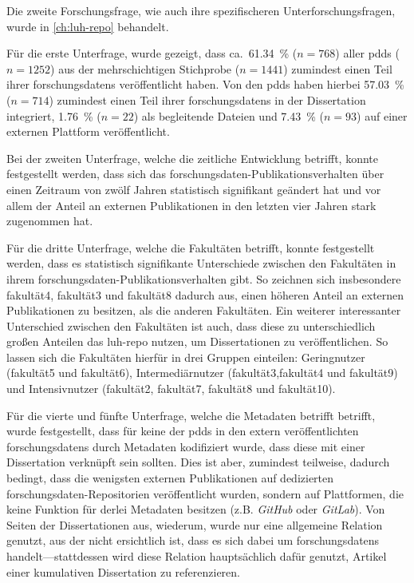 Die zweite Forschungsfrage, wie auch ihre spezifischeren Unterforschungsfragen, wurde in \cref{ch:luh-repo} behandelt.

Für die erste Unterfrage, wurde gezeigt, dass ca.~\SI{61,34}{\percent} ($n=\num{768}$) aller \glspl{pdd} ($n=\num{1252}$) aus der mehrschichtigen Stichprobe ($n=\num{1441}$) zumindest einen Teil ihrer \glspl{forschungsdaten} veröffentlicht haben.
Von den \glspl{pdd} haben hierbei \SI{57,03}{\percent} ($n=\num{714}$) zumindest einen Teil ihrer \glspl{forschungsdaten} in der Dissertation integriert, \SI{1,76}{\percent} ($n=\num{22}$) als begleitende Dateien und \SI{7,43}{\percent} ($n=\num{93}$) auf einer externen Plattform veröffentlicht.

Bei der zweiten Unterfrage, welche die zeitliche Entwicklung betrifft, konnte festgestellt werden, dass sich das \gls{forschungsdaten}-Publikationsverhalten über einen Zeitraum von zwölf Jahren statistisch signifikant geändert hat und vor allem der Anteil an externen Publikationen in den letzten vier Jahren stark zugenommen hat.

Für die dritte Unterfrage, welche die Fakultäten betrifft, konnte festgestellt werden, dass es statistisch signifikante Unterschiede zwischen den Fakultäten in ihrem \gls{forschungsdaten}-Publikationsverhalten gibt.
So zeichnen sich insbesondere \gls{fakultät4}, \gls{fakultät3} und \gls{fakultät8} dadurch aus, einen höheren Anteil an externen Publikationen zu besitzen, als die anderen Fakultäten.
Ein weiterer interessanter Unterschied zwischen den Fakultäten ist auch, dass diese zu unterschiedlich großen Anteilen das \gls{luh-repo} nutzen, um Dissertationen zu veröffentlichen.
So lassen sich die Fakultäten hierfür in drei Gruppen einteilen:
Geringnutzer (\gls{fakultät5} und \gls{fakultät6}), Intermediärnutzer (\gls{fakultät3},\gls{fakultät4} und \gls{fakultät9}) und Intensivnutzer (\gls{fakultät2}, \gls{fakultät7}, \gls{fakultät8} und \gls{fakultät10}).

Für die vierte und fünfte Unterfrage, welche die Metadaten betrifft betrifft, wurde festgestellt, dass für keine der \glspl{pdd} in den extern veröffentlichten \glspl{forschungsdaten} durch Metadaten kodifiziert wurde, dass diese mit einer Dissertation verknüpft sein sollten.
Dies ist aber, zumindest teilweise, dadurch bedingt, dass die wenigsten externen Publikationen auf dedizierten \gls{forschungsdaten}-Repositorien veröffentlicht wurden, sondern auf Plattformen, die keine Funktion für derlei Metadaten besitzen (z.B. \textit{GitHub} oder \textit{GitLab}).
Von Seiten der Dissertationen aus, wiederum, wurde nur eine allgemeine Relation genutzt, aus der nicht ersichtlich ist, dass es sich dabei um \glspl{forschungsdaten} handelt---stattdessen wird diese Relation hauptsächlich dafür genutzt, Artikel einer kumulativen Dissertation zu referenzieren.

